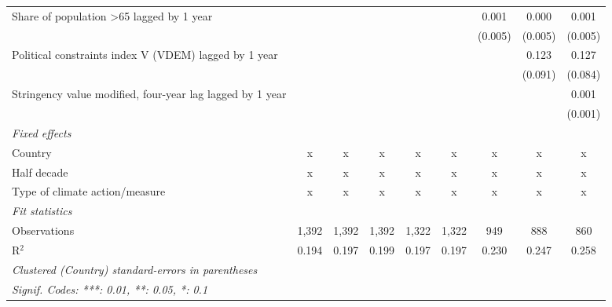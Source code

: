 \begin{tabular}{lcccccccc}
   Share of population >65 lagged by 1 year                        &               &               &               &               &               & 0.001         & 0.000         & 0.001\\   
                                                                   &               &               &               &               &               & (0.005)       & (0.005)       & (0.005)\\   
   Political constraints index V (VDEM) lagged by 1 year           &               &               &               &               &               &               & 0.123         & 0.127\\   
                                                                   &               &               &               &               &               &               & (0.091)       & (0.084)\\   
   Stringency value modified, four-year lag lagged by 1 year       &               &               &               &               &               &               &               & 0.001\\   
                                                                   &               &               &               &               &               &               &               & (0.001)\\   
   \emph{Fixed effects}\\
   Country                                                         & x             & x             & x             & x             & x             & x             & x             & x\\  
   Half decade                                                     & x             & x             & x             & x             & x             & x             & x             & x\\  
   Type of climate action/measure                                  & x             & x             & x             & x             & x             & x             & x             & x\\  
   \midrule \emph{Fit statistics}\\
   Observations                                                    & 1,392         & 1,392         & 1,392         & 1,322         & 1,322         & 949           & 888           & 860\\  
   R$^2$                                                           & 0.194         & 0.197         & 0.199         & 0.197         & 0.197         & 0.230         & 0.247         & 0.258\\  
   \midrule
   \multicolumn{9}{l}{\emph{Clustered (Country) standard-errors in parentheses}}\\
   \multicolumn{9}{l}{\emph{Signif. Codes: ***: 0.01, **: 0.05, *: 0.1}}\\
\end{tabular}
\par\endgroup


